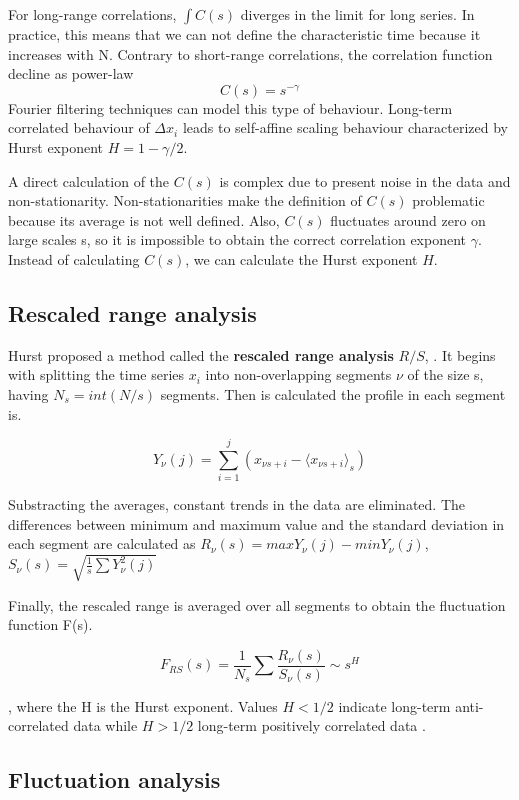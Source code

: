 For long-range correlations, $\int C(s)$ diverges in the limit for long series. In practice, this means that we can not define the characteristic time because it increases with N. Contrary to short-range correlations, the correlation function decline as power-law 
$$C(s) = s^{-\gamma}$$
Fourier filtering techniques can model this type of behaviour. Long-term correlated behaviour of $\Delta x_i$ leads to self-affine scaling behaviour characterized by Hurst exponent $H=1-\gamma/2$. 

A direct calculation of the $C(s)$ is complex due to present noise in the data and non-stationarity. Non-stationarities make the definition of $C(s)$ problematic because its average is not well defined. Also, $C(s)$ fluctuates around zero on large scales s, so it is impossible to obtain the correct correlation exponent $\gamma$. Instead of calculating $C(s)$, we can calculate the Hurst exponent $H$.

\subsection{Rescaled range analysis} 

Hurst proposed a method called the \textbf{rescaled range analysis} $R/S$, \cite{hurst1951long}. It begins with splitting the time series $x_i$ into non-overlapping segments $\nu$ of the size s, having $N_s = int(N/s)$ segments. Then is calculated the profile in each segment is. 

$$Y_\nu(j) = \sum_{i=1}^{j} (x_{\nu s +i} - \langle x_{\nu s + i } \rangle _s)$$

Substracting the averages, constant trends in the data are eliminated. The differences between minimum and maximum value and the standard deviation in each segment are calculated as $R_{\nu}(s) = max Y_\nu(j) - min Y_{\nu}(j)$, $S_{\nu}(s) = \sqrt{\frac{1}{s}\sum Y^2_{\nu}(j)}$

Finally, the rescaled range is averaged over all segments to obtain the fluctuation function F(s).

$$F_{RS}(s) = \frac{1}{N_s}\sum \frac{R_{\nu}(s)}{S_{\nu}(s)} \sim s^H$$

, where the H is the Hurst exponent. Values $H<1/2$ indicate long-term anti-correlated data while $H>1/2$ long-term positively correlated data \cite{kantelhardt2008fractal}. 

\subsection{Fluctuation analysis}

